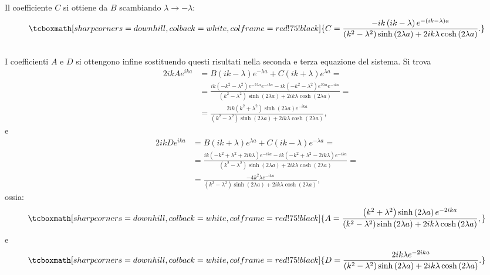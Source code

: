 \documentclass[a4paper,12pt,oneside]{book}
\begin{document}
Il coefficiente $C$ si ottiene da $B$ scambiando $\lambda \rightarrow -\lambda$:
	\begin{equation}
		\tcboxmath[sharp corners=downhill, colback=white, colframe=red!75!black]{
			C=\frac{-ik\left(ik-\lambda \right)e^{-\left(ik-\lambda\right) a }}{\left(k^2-\lambda^2\right)\sinh \left(2\lambda a\right)+2ik\lambda \cosh\left(2\lambda a\right)}.
			}
	\end{equation}\\
	
I coefficienti $A$ e $D$ si ottengono infine sostituendo questi risultati nella seconda e terza equazione del sistema. Si trova
	\begin{align}
 2ikAe^{ika} &= B \left(ik-\lambda\right)e^{-\lambda a} +C \left(ik+\lambda\right)e^{\lambda a}=\nonumber \\[0.3cm]
	& = \displaystyle{\frac{ik\left(-k^2-\lambda ^2 \right)e^{-2\lambda a }e^{-ika }-ik\left(-k^2-\lambda ^2 \right)e^{2\lambda a }e^{-ika }}{\left(k^2-\lambda^2\right)\sinh \left(2\lambda a\right)+2ik\lambda \cosh\left(2\lambda a\right)}=} \nonumber \\[0.3cm]
	&\displaystyle{ =\frac{2ik\left(k^2+\lambda ^2 \right)\sinh\left(2\lambda a\right)e^{-ika}}{\left(k^2-\lambda^2\right)\sinh \left(2\lambda a\right)+2ik\lambda \cosh\left(2\lambda a\right)}},
	\end{align}
e
	\begin{align}
		2ikD e^{ika} &= B\left(ik+\lambda\right)e^{\lambda a} + C\left(ik-\lambda\right)e^{-\lambda a} = \nonumber \\[0.3cm]
		& = \displaystyle{\frac{ik\left(-k^2 + \lambda ^2 +2ik\lambda\right)e^{-ika}-ik\left(-k^2 + \lambda ^2 -2ik\lambda\right)e^{-ika}}{\left(k^2-\lambda^2\right)\sinh \left(2\lambda a\right)+2ik\lambda \cosh\left(2\lambda a\right)}=} \nonumber \\[0.3cm]
	&\displaystyle{ =\frac{-4k^2\lambda e^{-ika}}{\left(k^2-\lambda^2\right)\sinh \left(2\lambda a\right)+2ik\lambda \cosh\left(2\lambda a\right)}},
	\end{align}
ossia:
	\begin{equation}
		\tcboxmath[sharp corners=downhill, colback=white, colframe=red!75!black]{
			A=\frac{\left(k^2+\lambda ^2\right)\sinh\left(2\lambda a \right)e^{-2ika}}{\left(k^2-\lambda^2\right)\sinh \left(2\lambda a\right)+2ik\lambda \cosh\left(2\lambda a\right)},
			}
	\end{equation}
e
	\begin{equation}
		\tcboxmath[sharp corners=downhill, colback=white, colframe=red!75!black]{
			D=\frac{2ik\lambda e^{-2ika}}{\left(k^2-\lambda^2\right)\sinh \left(2\lambda a\right)+2ik\lambda \cosh\left(2\lambda a\right)}.
			}
	\end{equation}\\
	
\end{document}
